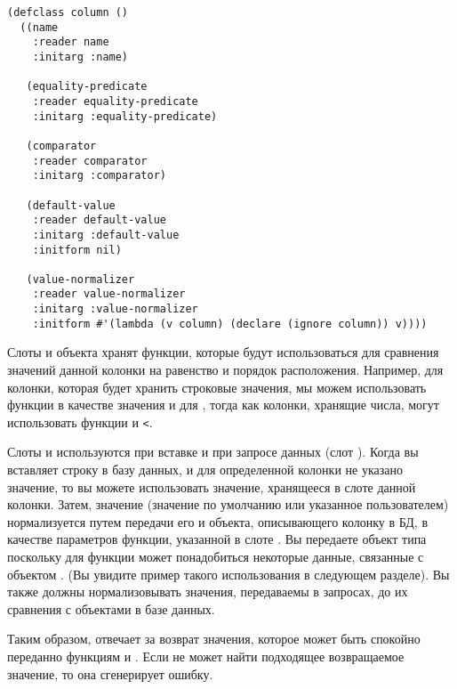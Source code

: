 \begin{lstlisting}
(defclass column ()
  ((name               
    :reader name
    :initarg :name)

   (equality-predicate
    :reader equality-predicate
    :initarg :equality-predicate)

   (comparator
    :reader comparator
    :initarg :comparator)

   (default-value
    :reader default-value
    :initarg :default-value
    :initform nil)

   (value-normalizer
    :reader value-normalizer
    :initarg :value-normalizer
    :initform #'(lambda (v column) (declare (ignore column)) v))))
\end{lstlisting}

Слоты  и  объекта  хранят функции,
которые будут использоваться для сравнения значений данной колонки на равенство и порядок
расположения.  Например, для колонки, которая будет хранить строковые значения, мы можем
использовать функции  в качестве значения  и
 для , тогда как колонки, хранящие числа, могут
использовать функции \code{=} и \lstinline!<!.

Слоты  и  используются при вставке и при
запросе данных (слот ).  Когда вы вставляет строку в базу данных, и
для определенной колонки не указано значение, то вы можете использовать значение,
хранящееся в слоте  данной колонки.  Затем, значение (значение по
умолчанию или указанное пользователем) нормализуется путем передачи его и объекта,
описывающего колонку в БД, в качестве параметров функции, указанной в слоте
.  Вы передаете объект типа  поскольку для функции
 может понадобиться некоторые данные, связанные с объектом
. (Вы увидите пример такого использования в следующем разделе).  Вы также
должны нормализовывать значения, передаваемы в запросах, до их сравнения с объектами в
базе данных.

Таким образом,  отвечает за возврат значения, которое может быть
спокойно переданно функциям  и .  Если
 не может найти подходящее возвращаемое значение, то она
сгенерирует ошибку.

